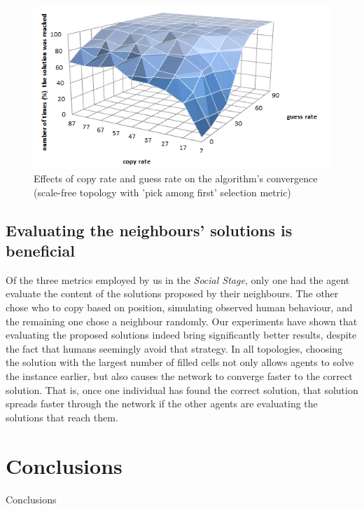 \documentclass[letterpaper]{article}
\begin{document}
\begin{figure}
\centering
\includegraphics[scale=0.60]{copy_guess_free_prob_num_solution_reached}
\caption{Effects of copy rate and guess rate on the algorithm's convergence (scale-free topology with 'pick among first' selection metric)
}
\label{fig:copy_guess_free_prob_num_solution_reached}
\end{figure}

\subsection{Evaluating the neighbours' solutions is beneficial}

Of the three metrics employed by us in the \emph{Social Stage}, only one had the agent evaluate the content of the solutions proposed by their neighbours. The other chose who to copy based on position, simulating observed human behaviour, and the remaining one chose a neighbour randomly. Our experiments have shown that evaluating the proposed solutions indeed bring significantly better results, despite the fact that humans seemingly avoid that strategy. In all topologies, choosing the solution with the largest number of filled cells not only allows agents to solve the instance earlier, but also causes the network to converge faster to the correct solution. That is, once one individual has found the correct solution, that solution spreads faster through the network if the other agents are evaluating the solutions that reach them.

\section{Conclusions}

Conclusions



\end{document}
